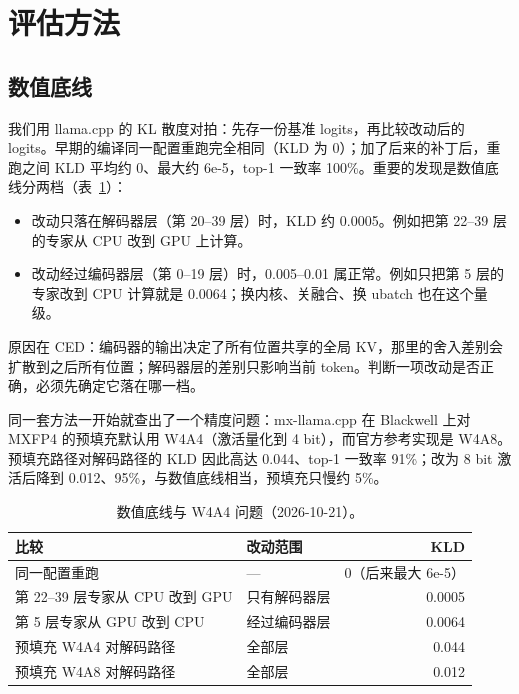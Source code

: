 \documentclass[11pt,a4paper]{article}
\begin{document}
\section{评估方法}

\subsection{数值底线}
\label{sec:floors}

我们用 llama.cpp 的 KL 散度对拍：先存一份基准 logits，再比较改动后的 logits。早期的编译同一配置重跑完全相同（KLD 为 0）；加了后来的补丁后，重跑之间 KLD 平均约 0、最大约 6e-5，top-1 一致率 100\%。重要的发现是数值底线分两档（表~\ref{tab:floors}）：

\begin{itemize}
  \item 改动只落在解码器层（第 20--39 层）时，KLD 约 0.0005。例如把第 22--39 层的专家从 CPU 改到 GPU 上计算。
  \item 改动经过编码器层（第 0--19 层）时，0.005--0.01 属正常。例如只把第 5 层的专家改到 CPU 计算就是 0.0064；换内核、关融合、换 ubatch 也在这个量级。
\end{itemize}

原因在 CED：编码器的输出决定了所有位置共享的全局 KV，那里的舍入差别会扩散到之后所有位置；解码器层的差别只影响当前 token。判断一项改动是否正确，必须先确定它落在哪一档。

同一套方法一开始就查出了一个精度问题：mx-llama.cpp 在 Blackwell 上对 MXFP4 的预填充默认用 W4A4（激活量化到 4 bit），而官方参考实现是 W4A8。预填充路径对解码路径的 KLD 因此高达 0.044、top-1 一致率 91\%；改为 8 bit 激活后降到 0.012、95\%，与数值底线相当，预填充只慢约 5\%。

\begin{table}[h]
  \centering
  \small
  \caption{数值底线与 W4A4 问题（2026-10-21）。}
  \label{tab:floors}
  \begin{tabular}{@{}l l r@{}}
    \toprule
    比较 & 改动范围 & KLD \\
    \midrule
    同一配置重跑 & — & 0（后来最大 6e-5） \\
    第 22--39 层专家从 CPU 改到 GPU & 只有解码器层 & 0.0005 \\
    第 5 层专家从 GPU 改到 CPU & 经过编码器层 & 0.0064 \\
    预填充 W4A4 对解码路径 & 全部层 & 0.044 \\
    预填充 W4A8 对解码路径 & 全部层 & 0.012 \\
    \bottomrule
  \end{tabular}
\end{table}
\end{document}
